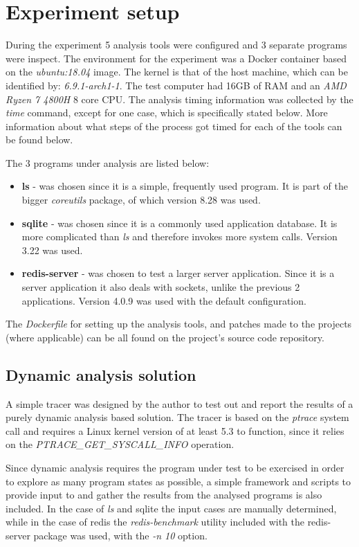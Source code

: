 \section{Experiment setup}
\label{sec:setup}
During the experiment 5 analysis tools were configured and 3 separate programs were inspect.
The environment for the experiment was a Docker container based on the \textit{ubuntu:18.04} image.
The kernel is that of the host machine, which can be identified by: \textit{6.9.1-arch1-1}.
The test computer had 16GB of RAM and an \textit{AMD Ryzen 7 4800H} 8 core CPU.
The analysis timing information was collected by the \textit{time} command, except for one case, which is specifically stated below. More information about what steps of the process got timed for each of the tools can be found below.

The 3 programs under analysis are listed below:
\begin{itemize}
    \item {\textbf{ls} - was chosen since it is a simple, frequently used program. It is part of the bigger \textit{coreutils} package, of which version 8.28 was used.}
    \item {\textbf{sqlite} - was chosen since it is a commonly used application database. It is more complicated than \textit{ls} and therefore invokes more system calls. Version 3.22 was used.}
    \item {\textbf{redis-server} - was chosen to test a larger server application. Since it is a server application it also deals with sockets, unlike the previous 2 applications. Version 4.0.9 was used with the default configuration.}
\end{itemize}

The \textit{Dockerfile} for setting up the analysis tools, and patches made to the projects (where applicable) can be all found on the project's source code repository.

\subsection {Dynamic analysis solution}
A simple tracer was designed by the author to test out and report the results of a purely dynamic analysis based solution.
The tracer is based on the \textit{ptrace} system call and requires a Linux kernel version of at least 5.3 to function, since it relies on the \textit{PTRACE\_GET\_SYSCALL\_INFO} operation.

Since dynamic analysis requires the program under test to be exercised in order to explore as many program states as possible, a simple framework and scripts to provide input to and gather the results from the analysed programs is also included. In the case of \textit{ls} and sqlite the input cases are manually determined, while in the case of redis the \textit{redis-benchmark} utility included with the redis-server package was used, with the \textit{-n 10} option.

